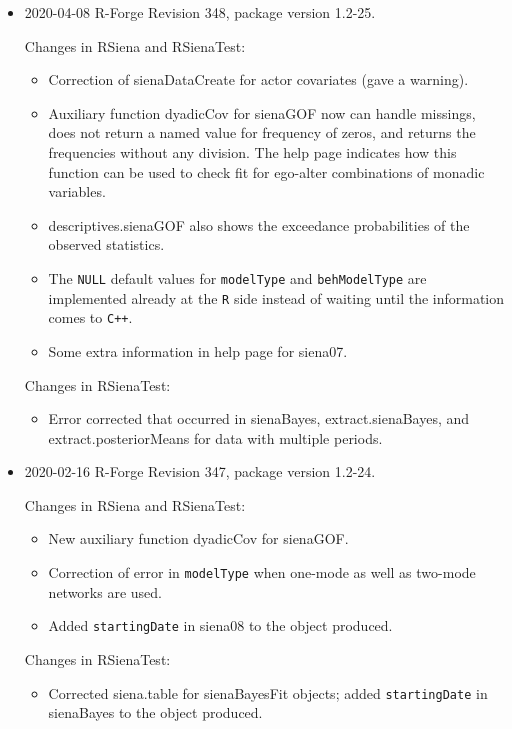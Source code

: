 \documentclass[a4paper,fleqn,11pt]{article}
\newcommand{\+}{\, + \,}
\newcommand{\sfn}[1]{\textsf{#1}}
\begin{document}
\begin{small}
\begin{itemize}
\item 2020-04-08 R-Forge Revision 348, package version 1.2-25.

Changes in \textsf{RSiena} and \textsf{RSienaTest}:
\begin{itemize}
 \item Correction of \textsf{sienaDataCreate} for actor covariates (gave a warning).
 \item Auxiliary function \sfn{dyadicCov} for \textsf{sienaGOF} now can handle missings,
     does not return a named value for frequency of zeros,
     and returns the frequencies without any division.
     The help page indicates how this function can be used to check fit
     for ego-alter combinations of monadic variables.
 \item \sfn{descriptives.sienaGOF} also shows the exceedance probabilities
     of the observed statistics.
 \item The \texttt{NULL} default values for \texttt{modelType}
     and \texttt{behModelType} are implemented already at the \texttt{R}
     side instead of waiting until the information comes to \texttt{C++}.
 \item Some extra information in help page for \textsf{siena07}.
\end{itemize}

Changes in \textsf{RSienaTest}:
\begin{itemize}
 \item Error corrected that occurred in \textsf{sienaBayes}, \sfn{extract.sienaBayes},
 and \sfn{extract.posteriorMeans} for data with multiple periods.
\end{itemize}


\item 2020-02-16 R-Forge Revision 347, package version 1.2-24.

Changes in \textsf{RSiena} and \textsf{RSienaTest}:
\begin{itemize}
\item New auxiliary function \sfn{dyadicCov} for \textsf{sienaGOF}.
\item Correction of error in \texttt{modelType} when one-mode as well as two-mode
     networks are used.
\item Added \texttt{startingDate} in \textsf{siena08} to the object produced.
\end{itemize}

Changes in \textsf{RSienaTest}:
\begin{itemize}
   \item Corrected \textsf{siena.table} for \sfn{sienaBayesFit} objects;
     added \texttt{startingDate} in \textsf{sienaBayes} to the object produced.
\end{itemize}



\end{itemize}
\end{small}
\end{document}
